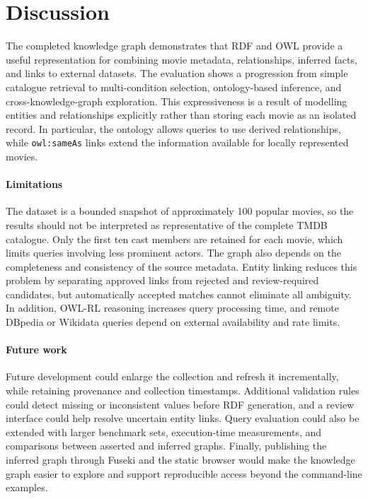 \section{Discussion}\label{sec:discussion}

The completed knowledge graph demonstrates that RDF and OWL provide a
useful representation for combining movie metadata, relationships, inferred
facts, and links to external datasets. The evaluation shows a progression
from simple catalogue retrieval to multi-condition selection, ontology-based
inference, and cross-knowledge-graph exploration. This expressiveness is a
result of modelling entities and relationships explicitly rather than
storing each movie as an isolated record. In particular, the ontology allows
queries to use derived relationships, while \texttt{owl:sameAs} links extend
the information available for locally represented movies.

\paragraph{Limitations}
The dataset is a bounded snapshot of approximately 100 popular movies, so
the results should not be interpreted as representative of the complete
TMDB catalogue. Only the first ten cast members are retained for each movie,
which limits queries involving less prominent actors. The graph also depends
on the completeness and consistency of the source metadata. Entity linking
reduces this problem by separating approved links from rejected and
review-required candidates, but automatically accepted matches cannot
eliminate all ambiguity. In addition, OWL-RL reasoning increases query
processing time, and remote DBpedia or Wikidata queries depend on external
availability and rate limits.

\paragraph{Future work}
Future development could enlarge the collection and refresh it
incrementally, while retaining provenance and collection timestamps.
Additional validation rules could detect missing or inconsistent values
before RDF generation, and a review interface could help resolve uncertain
entity links. Query evaluation could also be extended with larger benchmark
sets, execution-time measurements, and comparisons between asserted and
inferred graphs. Finally, publishing the inferred graph through Fuseki and
the static browser would make the knowledge graph easier to explore and
support reproducible access beyond the command-line examples.